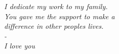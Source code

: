 \null{}
\begin{flushright}
{\it{
I dedicate my work to my family. \\
You gave me the support to make a \\
difference in other peoples lives. \\
- \\
I love you \\

}}
\end{flushright}
\null
\newpage